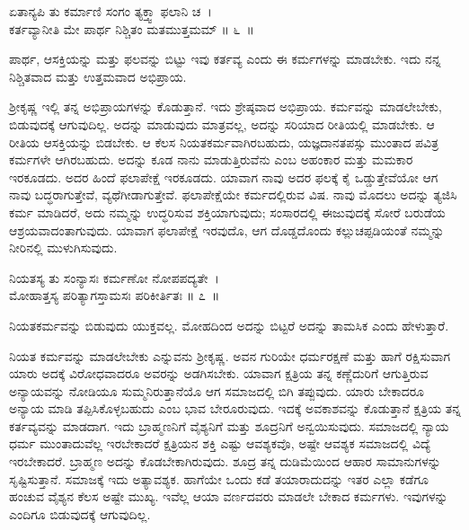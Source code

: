 \begin{shloka}
ಏತಾನ್ಯಪಿ ತು ಕರ್ಮಾಣಿ ಸಂಗಂ ತ್ಯಕ್ತ್ವಾ ಫಲಾನಿ ಚ~।\\ಕರ್ತವ್ಯಾನೀತಿ ಮೇ ಪಾರ್ಥ ನಿಶ್ಚಿತಂ ಮತಮುತ್ತಮಮ್ \hfill॥ ೬~॥
\end{shloka}

\begin{artha}
ಪಾರ್ಥ, ಆಸಕ್ತಿಯನ್ನು ಮತ್ತು ಫಲವನ್ನು ಬಿಟ್ಟು ಇವು ಕರ್ತವ್ಯ ಎಂದು ಈ ಕರ್ಮಗಳನ್ನು ಮಾಡಬೇಕು. ಇದು ನನ್ನ ನಿಶ್ಚಿತವಾದ ಮತ್ತು ಉತ್ತಮವಾದ ಅಭಿಪ್ರಾಯ.
\end{artha}

ಶ‍್ರೀಕೃಷ್ಣ ಇಲ್ಲಿ ತನ್ನ ಅಭಿಪ್ರಾಯಗಳನ್ನು ಕೊಡುತ್ತಾನೆ. ಇದು ಶ್ರೇಷ್ಠವಾದ ಅಭಿಪ್ರಾಯ. ಕರ್ಮವನ್ನು ಮಾಡಲೇಬೇಕು, ಬಿಡುವುದಕ್ಕೆ ಆಗುವುದಿಲ್ಲ. ಅದನ್ನು ಮಾಡುವುದು ಮಾತ್ರವಲ್ಲ, ಅದನ್ನು ಸರಿಯಾದ ರೀತಿಯಲ್ಲಿ ಮಾಡಬೇಕು. ಆ ರೀತಿಯ ಆಸಕ್ತಿಯನ್ನು ಬಿಡಬೇಕು. ಆ ಕೆಲಸ ನಿಯತಕರ್ಮವಾಗಿರಬಹುದು, ಯಜ್ಞದಾನತಪಸ್ಸು ಮುಂತಾದ ಪವಿತ್ರ ಕರ್ಮಗಳೇ ಆಗಿರಬಹುದು. ಅದನ್ನು ಕೂಡ ನಾನು ಮಾಡುತ್ತಿರುವೆನು ಎಂಬ ಅಹಂಕಾರ ಮತ್ತು ಮಮಕಾರ ಇರಕೂಡದು. ಅದರ ಹಿಂದೆ ಫಲಾಪೇಕ್ಷೆ ಇರಕೂಡದು. ಯಾವಾಗ ನಾವು ಅದರ ಫಲಕ್ಕೆ ಕೈ ಒಡ್ಡುತ್ತೇವೆಯೋ ಆಗ ನಾವು ಬದ್ಧರಾಗುತ್ತೇವೆ, ವ್ಯಥೆಗೀಡಾಗುತ್ತೇವೆ. ಫಲಾಪೇಕ್ಷೆಯೇ ಕರ್ಮದಲ್ಲಿರುವ ವಿಷ. ನಾವು ಮೊದಲು ಅದನ್ನು ತ್ಯಜಿಸಿ ಕರ್ಮ ಮಾಡಿದರೆ, ಅದು ನಮ್ಮನ್ನು ಉದ್ಧರಿಸುವ ಶಕ್ತಿಯಾಗುವುದು; ಸಂಸಾರದಲ್ಲಿ ಈಜುವುದಕ್ಕೆ ಸೋರೆ ಬರುಡೆಯ ಆಶ್ರಯವಾದಂತಾಗುವುದು. ಯಾವಾಗ ಫಲಾಪೇಕ್ಷೆ ಇರವುದೊ, ಆಗ ದೊಡ್ಡದೊಂದು ಕಲ್ಲು\-ಚಪ್ಪಡಿಯಂತೆ ನಮ್ಮನ್ನು ನೀರಿನಲ್ಲಿ ಮುಳುಗಿಸುವುದು.

\begin{shloka}
ನಿಯತಸ್ಯ ತು ಸಂನ್ಯಾಸಃ ಕರ್ಮಣೋ ನೋಪಪದ್ಯತೇ~।\\ಮೋಹಾತ್ತಸ್ಯ ಪರಿತ್ಯಾಗಸ್ತಾಮಸಃ ಪರಿಕೀರ್ತಿತಃ \hfill॥ ೭~॥
\end{shloka}

\begin{artha}
ನಿಯತಕರ್ಮವನ್ನು ಬಿಡುವುದು ಯುಕ್ತವಲ್ಲ. ಮೋಹದಿಂದ ಅದನ್ನು ಬಿಟ್ಟರೆ ಅದನ್ನು ತಾಮಸಿಕ ಎಂದು ಹೇಳುತ್ತಾರೆ.
\end{artha}

ನಿಯತ ಕರ್ಮವನ್ನು ಮಾಡಲೇಬೇಕು ಎನ್ನುವನು ಶ‍್ರೀಕೃಷ್ಣ. ಅವನ ಗುರಿಯೇ ಧರ್ಮರಕ್ಷಣೆ ಮತ್ತು ಹಾಗೆ ರಕ್ಷಿಸುವಾಗ ಯಾರು ಅದಕ್ಕೆ ವಿರೋಧವಾದರೂ ಅವರನ್ನು ಅಡಗಿಸಬೇಕು. ಯಾವಾಗ ಕ್ಷತ್ರಿಯ ತನ್ನ ಕಣ್ಣೆದುರಿಗೆ ಆಗುತ್ತಿರುವ ಅನ್ಯಾಯವನ್ನು ನೋಡಿಯೂ ಸುಮ್ಮನಿರುತ್ತಾನೆಯೊ ಆಗ ಸಮಾಜದಲ್ಲಿ ಬಿಗಿ ತಪ್ಪುವುದು. ಯಾರು ಬೇಕಾದರೂ ಅನ್ಯಾಯ ಮಾಡಿ ತಪ್ಪಿಸಿಕೊಳ್ಳಬಹುದು ಎಂಬ ಭಾವ ಬೇರೂರುವುದು. ಇದಕ್ಕೆ ಅವಕಾಶವನ್ನು ಕೊಡುತ್ತಾನೆ ಕ್ಷತ್ರಿಯ ತನ್ನ ಕರ್ತವ್ಯವನ್ನು ಮಾಡದಾಗ. ಇದು ಬ್ರಾಹ್ಮಣನಿಗೆ ವೈಶ್ಯನಿಗೆ ಮತ್ತು ಶೂದ್ರನಿಗೆ ಅನ್ವಯಿಸುವುದು. ಸಮಾಜದಲ್ಲಿ ನ್ಯಾಯ ಧರ್ಮ ಮುಂತಾದುವೆಲ್ಲ ಇರಬೇಕಾದರೆ ಕ್ಷತ್ರಿಯನ ಶಕ್ತಿ ಎಷ್ಟು ಆವಶ್ಯಕವೊ, ಅಷ್ಟೇ ಆವಶ್ಯಕ ಸಮಾಜದಲ್ಲಿ ವಿದ್ಯೆ ಇರಬೇಕಾದರೆ. ಬ್ರಾಹ್ಮಣ ಅದನ್ನು ಕೊಡಬೇಕಾಗಿರುವುದು. ಶೂದ್ರ ತನ್ನ ದುಡಿಮೆಯಿಂದ ಆಹಾರ ಸಾಮಾನುಗಳನ್ನು ಸೃಷ್ಟಿಸುತ್ತಾನೆ. ಸಮಾಜಕ್ಕೆ ಇದು ಅತ್ಯಾವಶ್ಯಕ. ಹಾಗೆಯೇ ಒಂದು ಕಡೆ ತಯಾರಾದುದನ್ನು ಇತರ ಎಲ್ಲಾ ಕಡೆಗೂ ಹಂಚುವ ವೈಶ್ಯನ ಕೆಲಸ ಅಷ್ಟೇ ಮುಖ್ಯ. ಇವೆಲ್ಲ ಆಯಾ ವರ್ಣದವರು ಮಾಡಲೇ ಬೇಕಾದ ಕರ್ಮಗಳು. ಇವುಗಳನ್ನು ಎಂದಿಗೂ ಬಿಡುವುದಕ್ಕೆ ಆಗುವುದಿಲ್ಲ.

